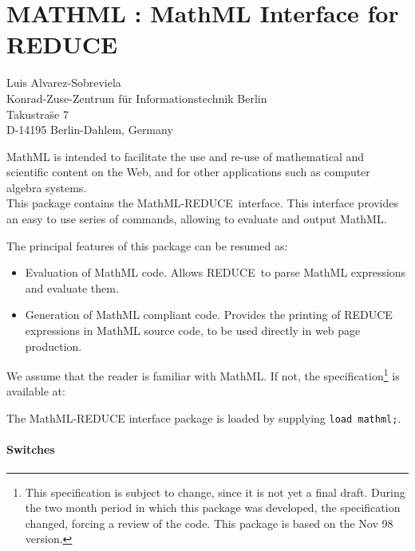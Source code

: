 \documentclass[11pt,letterpaper]{book}
\makeatletter
\newcommand{\REDUCE}{REDUCE}
\newcommand{\underscore}{\_}
\newcommand{\ttindex}[1]{{\renewcommand{\_}{\protect\underscore}%
                          \index{#1@{\tt #1}}}}
\makeatother
\begin{document}
\chapter{MATHML : MathML Interface for REDUCE }
\label{MATHML}


{\footnotesize
\begin{center}
Luis Alvarez-Sobreviela \\
Konrad-Zuse-Zentrum f\"ur Informationstechnik Berlin \\
Takustra\"se 7 \\
D-14195 Berlin-Dahlem, Germany \\
\end{center}
}
\ttindex{MATHML}

MathML is intended to facilitate the use and re-use of mathematical and
scientific content on the Web, and for other applications such as computer
algebra systems. \\
This package contains the MathML-{\REDUCE}\ interface.
This interface provides an easy to use series of commands,
allowing to evaluate and output MathML.

The principal features of this package can be resumed as:
\begin{itemize}
\item Evaluation of MathML code. Allows {\REDUCE}\  to parse MathML expressions
and evaluate them.
\item Generation of MathML compliant code. Provides the printing of REDUCE
expressions in MathML source code, to be used directly in web page
production.

\end{itemize}

We assume that the reader is familiar with MathML. If not, the
specification\footnote{This specification is subject to change, since it is
not yet a final draft. During the two month period in which this package was
developed, the specification changed, forcing a review of the code. This
package is based on the Nov 98 version.}
is available at: 



The MathML-{\REDUCE} interface package is loaded by supplying {\tt load mathml;}.

\subsubsection{Switches}
\end{document}
